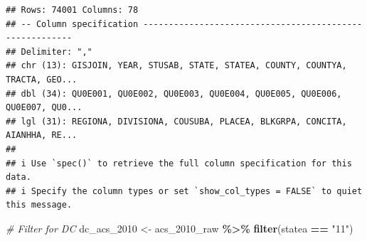\documentclass[
]{article}
\newenvironment{Shaded}{\begin{snugshade}}{\end{snugshade}}
\newcommand{\CommentTok}[1]{\textcolor[rgb]{0.56,0.35,0.01}{\textit{#1}}}
\newcommand{\FunctionTok}[1]{\textcolor[rgb]{0.13,0.29,0.53}{\textbf{#1}}}
\newcommand{\NormalTok}[1]{#1}
\newcommand{\OtherTok}[1]{\textcolor[rgb]{0.56,0.35,0.01}{#1}}
\newcommand{\SpecialCharTok}[1]{\textcolor[rgb]{0.81,0.36,0.00}{\textbf{#1}}}
\newcommand{\StringTok}[1]{\textcolor[rgb]{0.31,0.60,0.02}{#1}}
\begin{document}
\begin{verbatim}
## Rows: 74001 Columns: 78
## -- Column specification --------------------------------------------------------
## Delimiter: ","
## chr (13): GISJOIN, YEAR, STUSAB, STATE, STATEA, COUNTY, COUNTYA, TRACTA, GEO...
## dbl (34): QU0E001, QU0E002, QU0E003, QU0E004, QU0E005, QU0E006, QU0E007, QU0...
## lgl (31): REGIONA, DIVISIONA, COUSUBA, PLACEA, BLKGRPA, CONCITA, AIANHHA, RE...
## 
## i Use `spec()` to retrieve the full column specification for this data.
## i Specify the column types or set `show_col_types = FALSE` to quiet this message.
\end{verbatim}

\begin{Shaded}
\begin{Highlighting}[]
\CommentTok{\# Filter for DC}
\NormalTok{dc\_acs\_2010 }\OtherTok{\textless{}{-}}\NormalTok{ acs\_2010\_raw }\SpecialCharTok{\%\textgreater{}\%}
  \FunctionTok{filter}\NormalTok{(statea }\SpecialCharTok{==} \StringTok{"11"}\NormalTok{)}


\end{Highlighting}
\end{Shaded}
\end{document}
